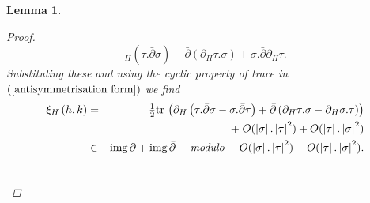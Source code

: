 \documentclass{article}
\newcommand{\func}[1]{\textnormal {#1\,}}
\newtheorem{lemma}[theorem]{Lemma}
\begin{document}
\begin{lemma}
\begin{proof}
\begin{equation*}
_{H}\left( \tau .\bar{\partial}\sigma \right) -\bar{\partial}\left( \partial
_{H}\tau .\sigma \right) +\sigma .\bar{\partial}\partial _{H}\tau .
\end{equation*}%
Substituting these and using the cyclic property of trace in $\left( \ref%
{antisymmetrisation form}\right) $ we find%
\begin{eqnarray*}
        \xi _{H}\left( h,k\right) &=&\tfrac{1}{2}\func{tr}
        \left( \partial_{H}\left( \tau .\bar{\partial}\sigma 
        -\sigma .\bar{\partial}\tau \right) 
        +\bar{\partial}\left( \partial _{H}\tau .\sigma 
        -\partial _{H}\sigma .\tau\right) \right)\\
        &&+ \; O(\left\vert\sigma\right\vert.\left\vert\tau\right\vert^{2})
        +O( \left\vert\tau\right\vert.\left\vert\sigma\right\vert ^{2}) \\
        &\in &\func{img}\partial +\func{img}\bar{\partial} 
        \quad\text{ \emph{modulo} }\quad
        O(\left\vert\sigma\right\vert.\left\vert\tau\right\vert ^{2})
        +O( \left\vert\tau\right\vert.\left\vert\sigma\right\vert ^{2}).
\end{eqnarray*}
\vspace{-1.3cm}\[\qedhere\]
\end{proof}
\end{lemma}
\end{document}
